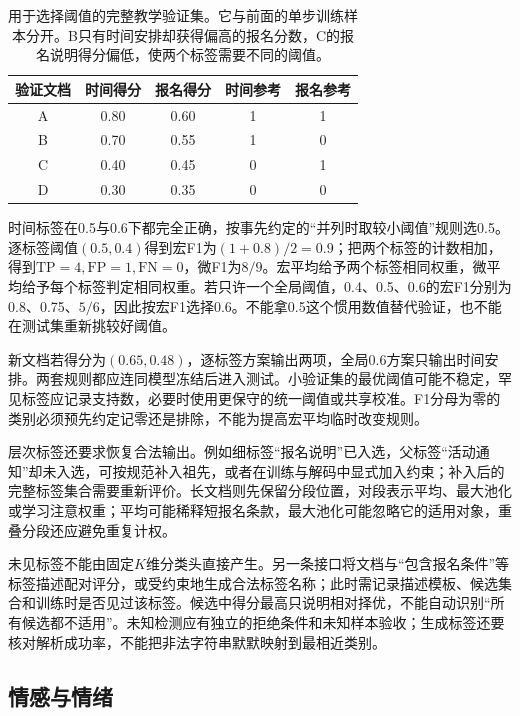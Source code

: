 \begin{table}[htbp]
  \centering
  \begin{tabular}{@{}ccccc@{}}
    \toprule
    验证文档 & 时间得分 & 报名得分 & 时间参考 & 报名参考 \\
    \midrule
    A & 0.80 & 0.60 & 1 & 1 \\
    B & 0.70 & 0.55 & 1 & 0 \\
    C & 0.40 & 0.45 & 0 & 1 \\
    D & 0.30 & 0.35 & 0 & 0 \\
    \bottomrule
  \end{tabular}
  \caption{用于选择阈值的完整教学验证集。它与前面的单步训练样本分开。B只有时间安排却获得偏高的报名分数，C的报名说明得分偏低，使两个标签需要不同的阈值。}
  \label{tab:nlp-classification-thresholds}
\end{table}

时间标签在0.5与0.6下都完全正确，按事先约定的“并列时取较小阈值”规则选0.5。逐标签阈值$(0.5,0.4)$得到宏F1为$(1+0.8)/2=0.9$；把两个标签的计数相加，得到$\mathrm{TP}=4,\mathrm{FP}=1,\mathrm{FN}=0$，微F1为$8/9$。宏平均给予两个标签相同权重，微平均给予每个标签判定相同权重。若只许一个全局阈值，0.4、0.5、0.6的宏F1分别为0.8、0.75、$5/6$，因此按宏F1选择0.6。不能拿0.5这个惯用数值替代验证，也不能在测试集重新挑较好阈值。

新文档若得分为$(0.65,0.48)$，逐标签方案输出两项，全局0.6方案只输出时间安排。两套规则都应连同模型冻结后进入测试。小验证集的最优阈值可能不稳定，罕见标签应记录支持数，必要时使用更保守的统一阈值或共享校准。F1分母为零的类别必须预先约定记零还是排除，不能为提高宏平均临时改变规则。

层次标签还要求恢复合法输出。例如细标签“报名说明”已入选，父标签“活动通知”却未入选，可按规范补入祖先，或者在训练与解码中显式加入约束；补入后的完整标签集合需要重新评价。长文档则先保留分段位置，对段表示平均、最大池化或学习注意权重；平均可能稀释短报名条款，最大池化可能忽略它的适用对象，重叠分段还应避免重复计权。

未见标签不能由固定$K$维分类头直接产生。另一条接口将文档与“包含报名条件”等标签描述配对评分，或受约束地生成合法标签名称；此时需记录描述模板、候选集合和训练时是否见过该标签。候选中得分最高只说明相对择优，不能自动识别“所有候选都不适用”。未知检测应有独立的拒绝条件和未知样本验收；生成标签还要核对解析成功率，不能把非法字符串默默映射到最相近类别。

\subsection{情感与情绪}
\label{sec:nlp-classification-sentiment}

